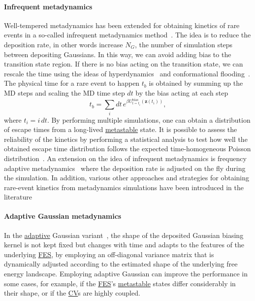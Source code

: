 \documentclass[9pt,review]{livecoms}
\newcommand{\vz}{\mathbf{z}}
\begin{document}
\paragraph{Infrequent metadynamics}
\label{sec:infreq_meta}
Well-tempered metadynamics has been extended for obtaining kinetics of rare events in a so-called infrequent metadynamics method~\cite{Tiwary-PRL-2013}. The idea is to reduce the deposition rate, in other words increase $N_{G}$, the number of simulation steps between depositing Gaussians. In this way, we can avoid adding bias to the transition state region. If there is no bias acting on the transition state, we can rescale the time using the ideas of hyperdynamics~\cite{Voter-PRL-1997} and conformational flooding~\cite{Grubmuller-PRE-1995}. The physical time for a rare event to happen $t_b$ is obtained by summing up the MD steps and scaling the MD time step $dt$ by the bias acting at each step
\begin{equation}
\label{wtmetad_hyperdynamics}
t_b = \sum_{i} dt \, e^{\beta U_{t=t_{i}}^{\mathrm{bias}}(\vz(t_{i}))},
\end{equation}
where $t_{i} = i\, dt$. By performing multiple simulations, one can obtain a distribution of escape times from a long-lived \hyperlink{ref:metastab} {metastable} state. It is possible to assess the reliability of the kinetics by performing a statistical analysis to test how well the obtained escape time distribution follows the expected time-homogeneous Poisson distribution~\cite{KS_Test_JCTC_2014}. An extension on the idea of infrequent metadynamics is frequency adaptive metadynamics~\cite{Wang2018_FA-MetaD} where the deposition rate is adjusted on the fly during the simulation. In addition, various other approaches and strategies for obtaining rare-event kinetics from metadynamics simulations have been introduced in the literature~\cite{
10.1021/acs.biochem.8b00977,
10.1021/ar500356n,
10.1371/journal.pcbi.1000452,
10.1021/ja903045y,
10.1103/physrevlett.110.108106,
10.1063/1.5027728,
10.1103/physreve.98.052408, 
10.1063/5.0019100,
10.1021/acs.jpclett.2c01807}

\paragraph{Adaptive Gaussian metadynamics}
\label{sec:AGmeta}
In the \hyperlink{ref:Adaptive} {adaptive} Gaussian variant~\cite{Branduardi-JCTC-2012}, the shape of the deposited Gaussian biasing kernel is not kept fixed but changes with time and adapts to the features of the underlying \hyperlink{ref:FES} {FES}, by employing an off-diagonal variance matrix that is dynamically adjusted according to the estimated shape of the underlying free energy landscape. Employing adaptive Gaussian can improve the performance in some cases, for example, if the \hyperlink{ref:FES} {FES}'s \hyperlink{ref:metastab} {metastable} states differ considerably in their shape, or if the \hyperlink{ref:CV} {CV}s are highly coupled.
\end{document}
